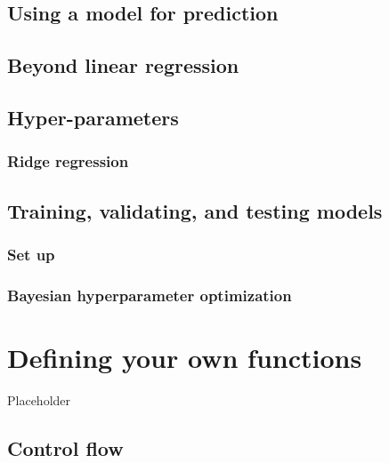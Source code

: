 \documentclass[]{gitbook}
\begin{document}
\hypertarget{using-a-model-for-prediction}{%
\subsection{Using a model for prediction}\label{using-a-model-for-prediction}}

\hypertarget{beyond-linear-regression}{%
\subsection{Beyond linear regression}\label{beyond-linear-regression}}

\hypertarget{hyper-parameters}{%
\subsection{Hyper-parameters}\label{hyper-parameters}}

\hypertarget{ridge-regression}{%
\subsubsection{Ridge regression}\label{ridge-regression}}

\hypertarget{training-validating-and-testing-models}{%
\subsection{Training, validating, and testing models}\label{training-validating-and-testing-models}}

\hypertarget{set-up}{%
\subsubsection{Set up}\label{set-up}}

\hypertarget{bayesian-hyperparameter-optimization}{%
\subsubsection{Bayesian hyperparameter optimization}\label{bayesian-hyperparameter-optimization}}

\hypertarget{defining-your-own-functions}{%
\section{Defining your own functions}\label{defining-your-own-functions}}

Placeholder

\hypertarget{control-flow}{%
\subsection{Control flow}\label{control-flow}}
\end{document}
